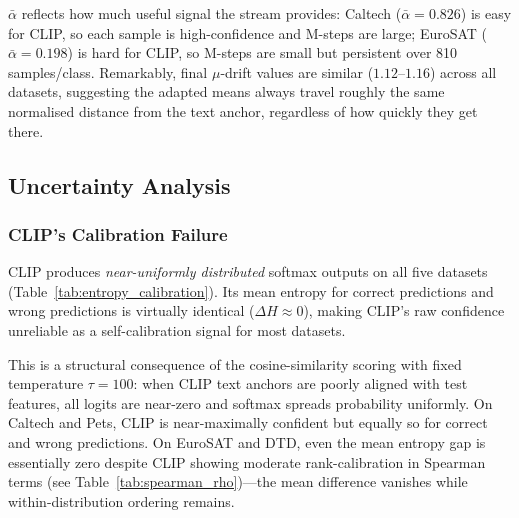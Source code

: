\documentclass[12pt,a4paper]{article}
\newcommand{\1}{\mathbf{1}}
\begin{document}
$\bar{\alpha}$ reflects how much useful signal the stream provides:
Caltech ($\bar{\alpha}=0.826$) is easy for CLIP, so each sample is high-confidence and M-steps are
large; EuroSAT ($\bar{\alpha}=0.198$) is hard for CLIP, so M-steps are small but persistent over
810 samples/class.
Remarkably, final $\mu$-drift values are similar ($1.12$--$1.16$) across all datasets, suggesting
the adapted means always travel roughly the same normalised distance from the text anchor,
regardless of how quickly they get there.

\subsection{Uncertainty Analysis}

\subsubsection{CLIP's Calibration Failure}

CLIP produces \emph{near-uniformly distributed} softmax outputs on all five datasets (Table~\ref{tab:entropy_calibration}).
Its mean entropy for correct predictions and wrong predictions is virtually identical ($\Delta H \approx 0$),
making CLIP's raw confidence unreliable as a self-calibration signal for most datasets.

This is a structural consequence of the cosine-similarity scoring with fixed temperature $\tau=100$:
when CLIP text anchors are poorly aligned with test features, all logits are near-zero and softmax spreads probability uniformly.
On Caltech and Pets, CLIP is near-maximally confident but equally so for correct and wrong predictions.
On EuroSAT and DTD, even the mean entropy gap is essentially zero despite CLIP showing moderate rank-calibration
in Spearman terms (see Table~\ref{tab:spearman_rho})---the mean difference vanishes while within-distribution ordering remains.
\end{document}

